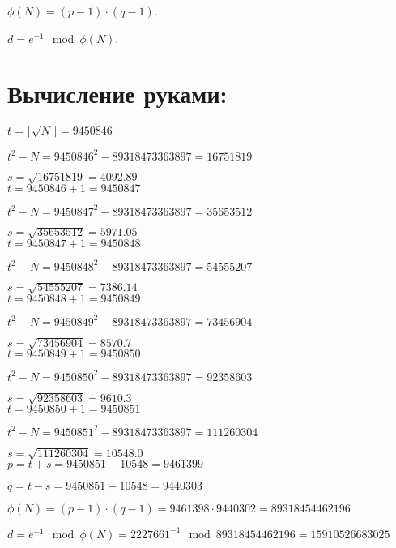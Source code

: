 \documentclass[a4paper, 14pt]{report}
\begin{document}
$\phi(N) = (p - 1) \cdot (q - 1)$.

$d = e^{-1} \mod \phi(N)$.

\section*{Вычисление руками:}
{}

$t = \lceil \sqrt{N} \rceil = 9450846$

$t^2 - N = 9450846^2 - 89318473363897 = 16751819$

$s = \sqrt{16751819} = 4092.89$\\[0.5cm]


$t = 9450846 + 1 = 9450847$

$t^2 - N = 9450847^2 - 89318473363897 = 35653512$

$s = \sqrt{35653512} = 5971.05$\\[0.5cm]



$t = 9450847 + 1 = 9450848$

$t^2 - N = 9450848^2 - 89318473363897 = 54555207$

$s = \sqrt{54555207} = 7386.14$\\[0.5cm]



$t = 9450848 + 1 = 9450849$

$t^2 - N = 9450849^2 - 89318473363897 = 73456904$

$s = \sqrt{73456904} = 8570.7$\\[0.5cm]


$t = 9450849 + 1 = 9450850$

$t^2 - N = 9450850^2 - 89318473363897 = 92358603$

$s = \sqrt{92358603} = 9610.3$\\[0.5cm]


$t = 9450850 + 1 = 9450851$

$t^2 - N = 9450851^2 - 89318473363897 = 111260304$

$s = \sqrt{111260304} = 10548.0$\\[0.5cm]


$p = t + s = 9450851 + 10548 = 9461399$

$q = t - s = 9450851 - 10548 = 9440303$

$\phi(N) = (p - 1) \cdot (q - 1) = 9461398 \cdot 9440302 = 89318454462196$

$d = e^{-1} \mod \phi(N) = 2227661^{-1} \mod 89318454462196 = 15910526683025$
\end{document}
